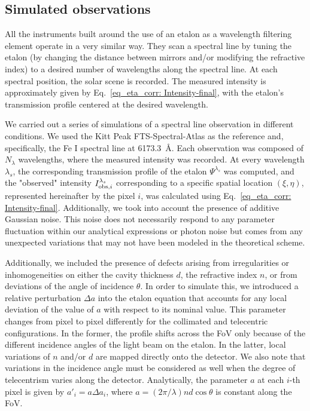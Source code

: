 \subsection{\label{eta_corr_susec: simulating obs} Simulated observations}
  
All the instruments built around the use of an etalon as a wavelength filtering element operate in a very similar way. They scan a spectral line by tuning the etalon (by changing the distance between mirrors and/or modifying the refractive index) to a desired number of wavelengths along the spectral line. At each spectral position, the solar scene is recorded. The measured intensity is approximately given by Eq.~\eqref{eq_eta_corr: Intensity-final}, with the etalon's transmission profile centered at the desired wavelength.

We carried out a series of simulations of a spectral line observation in different conditions. We used the Kitt Peak FTS-Spectral-Atlas as the reference \citep{fts} and, specifically, the Fe I spectral line at 6173.3~\r{A}. Each observation was composed of $N_\lambda$ wavelengths, where the measured intensity was recorded. At every wavelength $\lambda_s$, the corresponding transmission profile of the etalon $\Psi^{\lambda_s}$ was computed, and the "observed" intensity $I ^{\lambda _ s} _ {{\rm obs}, i}$ corresponding to a specific spatial location $(\xi, \eta)$, represented hereinafter by the pixel $i$, was calculated using Eq.~\eqref{eq_eta_corr: Intensity-final}. Additionally, we took into account the presence of additive Gaussian noise. This noise does not necessarily respond to any parameter fluctuation within our analytical expressions or photon noise but comes from any unexpected variations that may not have been modeled in the theoretical scheme.

Additionally, we included the presence of defects arising from irregularities or inhomogeneities on either the cavity thickness $d$, the refractive index $n$, or from deviations of the angle of incidence $\theta$. In order to simulate this, we introduced a relative perturbation $\Delta a$ into the etalon equation that accounts for any local deviation of the value of $a$ with respect to its nominal value. This parameter changes from pixel to pixel differently for the collimated and telecentric configurations. In the former, the profile shifts across the FoV only because of the different incidence angles of the light beam on the etalon. In the latter, local variations of $n$ and/or $d$ are mapped directly onto the detector. We also note that variations in the incidence angle must be considered as well when the degree of telecentrism varies along the detector. Analytically, the parameter $a$ at each $i$-th pixel is given by $a' _ i = a \Delta a _ i$, where $a = (2\pi/\lambda) n d\cos\theta$ is constant along the FoV.

